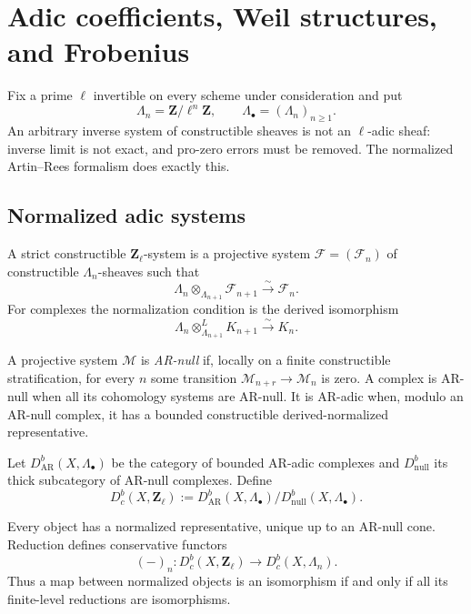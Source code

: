 \chapter{Adic coefficients, Weil structures, and Frobenius}
\label{ch:adic-weil}

Fix a prime \(\ell\) invertible on every scheme under consideration and put
\[
 \Lambda_n=\mathbf Z/\ell^n\mathbf Z,\qquad
 \Lambda_\bullet=(\Lambda_n)_{n\geq1}.
\]
An arbitrary inverse system of constructible sheaves is not an
\(\ell\)-adic sheaf: inverse limit is not exact, and pro-zero errors must be
removed.  The normalized Artin--Rees formalism does exactly this.

\section{Normalized adic systems}

\begin{definition}
\label{def:strict-adic-system}
A strict constructible \(\mathbf Z_\ell\)-system is a projective system
\(\mathcal F=(\mathcal F_n)\) of constructible \(\Lambda_n\)-sheaves such that
\[
 \Lambda_n\otimes_{\Lambda_{n+1}}\mathcal F_{n+1}
 \xrightarrow{\sim}\mathcal F_n.
\]
For complexes the normalization condition is the derived isomorphism
\[
 \Lambda_n\otimes^L_{\Lambda_{n+1}}K_{n+1}
 \xrightarrow{\sim}K_n.
\]
\end{definition}

A projective system \(\mathcal M\) is \emph{AR-null} if, locally on a finite
constructible stratification, for every \(n\) some transition
\(\mathcal M_{n+r}\to\mathcal M_n\) is zero.  A complex is AR-null when all its
cohomology systems are AR-null.  It is AR-adic when, modulo an AR-null
complex, it has a bounded constructible derived-normalized representative.

\begin{definition}
\label{def:normalized-adic}
Let \(D^b_{\mathrm{AR}}(X,\Lambda_\bullet)\) be the category of bounded
AR-adic complexes and \(D^b_{\mathrm{null}}\) its thick subcategory of
AR-null complexes.  Define
\[
 D^b_c(X,\mathbf Z_\ell)
 :=
 D^b_{\mathrm{AR}}(X,\Lambda_\bullet)/
 D^b_{\mathrm{null}}(X,\Lambda_\bullet).
\]
\end{definition}

\begin{proposition}
Every object has a normalized representative, unique up to an AR-null cone.
Reduction defines conservative functors
\[
 (-)_n:D^b_c(X,\mathbf Z_\ell)\longrightarrow D^b_c(X,\Lambda_n).
\]
Thus a map between normalized objects is an isomorphism if and only if all its
finite-level reductions are isomorphisms.
\end{proposition}

